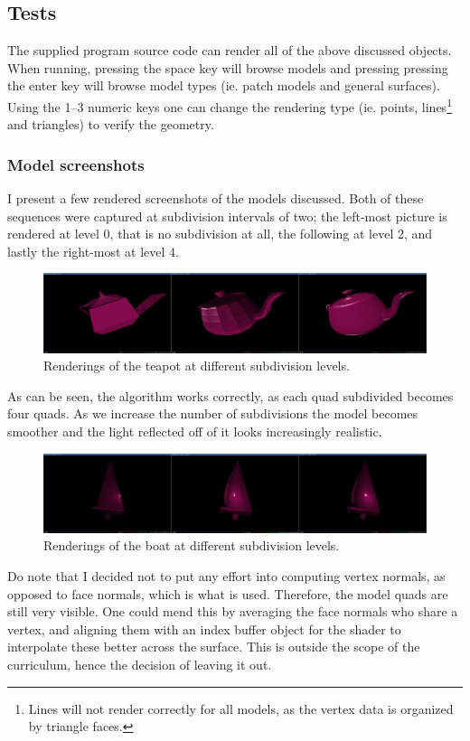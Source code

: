 \documentclass[11pt]{article}
\begin{document}
\newpage
\subsection{Tests}
The supplied program source code can render all of the above discussed
objects. When running, pressing the space key will browse models and pressing
pressing the enter key will browse model types (ie. patch models and general
surfaces). Using the 1--3 numeric keys one can change the rendering type (ie.
points, lines\footnote{Lines will not render correctly for all models, as the
vertex data is organized by triangle faces.} and triangles) to verify the
geometry.

\subsubsection{Model screenshots}
I present a few rendered screenshots of the models discussed. Both of these
sequences were captured at subdivision intervals of two; the left-most picture
is rendered at level 0, that is no subdivision at all, the following at level
2, and lastly the right-most at level 4.
\begin{figure}[H]
    \center
    \includegraphics[scale=0.25]{figures/teapot}
    \caption{Renderings of the teapot at different subdivision levels.}
    \label{fig:teapot}
\end{figure}
As can be seen, the algorithm works correctly, as each quad subdivided becomes
four quads. As we increase the number of subdivisions the model becomes
smoother and the light reflected off of it looks increasingly realistic.
\begin{figure}[H]
    \center
    \includegraphics[scale=0.25]{figures/boat}
    \caption{Renderings of the boat at different subdivision levels.}
    \label{fig:boat}
\end{figure}
Do note that I decided not to put any effort into computing vertex normals, as
opposed to face normals, which is what is used. Therefore, the model quads are
still very visible. One could mend this by averaging the face normals who
share a vertex, and aligning them with an index buffer object for the shader
to interpolate these better across the surface. This is outside the scope of
the curriculum, hence the decision of leaving it out.
\end{document}
